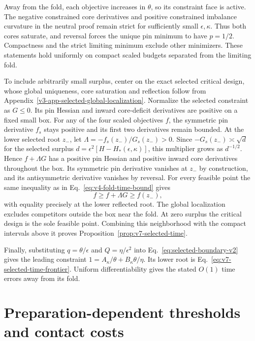 \documentclass[aps,pre,reprint,amsmath,amssymb,longbibliography]{revtex4-2}
\begin{document}
Away from the fold, each objective increases in $\theta$, so its
constraint face is active. The negative constrained core derivatives
and positive constrained imbalance curvature in the neutral proof
remain strict for sufficiently small $\epsilon,\kappa$.
Thus both cores saturate, and reversal forces the unique pin minimum
to have $p=1/2$. Compactness and the strict limiting minimum exclude
other minimizers. These statements hold uniformly on compact scaled
budgets separated from the limiting fold.

To include arbitrarily small surplus, center on the exact selected
critical design, whose global uniqueness, core saturation and
reflection follow from
Appendix~\ref{v3-app-selected-global-localization}.
Normalize the selected constraint as $G\le0$. Its pin Hessian and
inward core-deficit derivatives are positive on a fixed small box.
For any of the four scaled objectives $f$, the symmetric pin
derivative $f_s$ stays positive and its first two derivatives remain
bounded. At the lower selected root $z_-$, let
$\Lambda=-f_s(z_-)/G_s(z_-)>0$. Since
$-G_s(z_-)\asymp\sqrt d$ for the selected surplus
$d=\epsilon^2[H-H_*(\epsilon,\kappa)]$, this multiplier grows as
$d^{-1/2}$. Hence $f+\Lambda G$ has a positive pin Hessian and
positive inward core derivatives throughout the box. Its symmetric
pin derivative vanishes at $z_-$ by construction, and its
antisymmetric derivative vanishes by reversal. For every feasible
point the same inequality as in Eq.~\eqref{eq:v4-fold-time-bound}
gives
\begin{equation}
 f\ge f+\Lambda G\ge f(z_-),
 \label{eq:v7-selected-fold-time-bound}
\end{equation}
with equality precisely at the lower reflected root. The global
localization excludes competitors outside the box near the fold.
At zero surplus the critical design is the sole feasible point.
Combining this neighborhood with the compact intervals above it
proves Proposition~\ref{prop:v7-selected-time}.

Finally, substituting $q=\theta/\epsilon$ and
$Q=\eta/\epsilon^2$ into Eq.~\eqref{eq:selected-boundary-v2}
gives the leading constraint
$1=A_\kappa/\theta+B_\kappa\theta/\eta$.
Its lower root is Eq.~\eqref{eq:v7-selected-time-frontier}.
Uniform differentiability gives the stated $O(1)$ time errors away
from its fold.



\section{Preparation-dependent thresholds and contact costs}
\label{app:v7-preparation}
\end{document}
